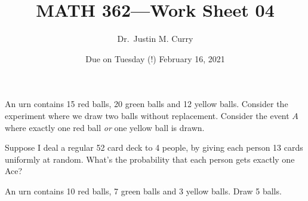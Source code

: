 \documentclass[addpoints,12pt]{exam}
\title{\vspace{-1in} MATH 362---Work Sheet 04}
\date{Due on Tuesday (!) February 16, 2021}
\author{Dr.~Justin M. Curry}
\begin{document}
\maketitle


\begin{questions}
\question[4]
An urn contains 15 red balls, 20 green balls and 12 yellow balls. Consider the experiment where we draw two balls without replacement. Consider the event $A$ where exactly one red ball {\em or} one yellow ball is drawn.
\noaddpoints
{}
\addpoints

\question[2] Suppose I deal a regular 52 card deck to 4 people, by giving each person 13 cards uniformly at random. What's the probability that each person gets exactly one Ace?

\vspace{2in}

\question[2] An urn contains 10 red balls, 7 green balls and 3 yellow balls. Draw 5 balls. 
\noaddpoints
{}
\end{questions}
\end{document}
